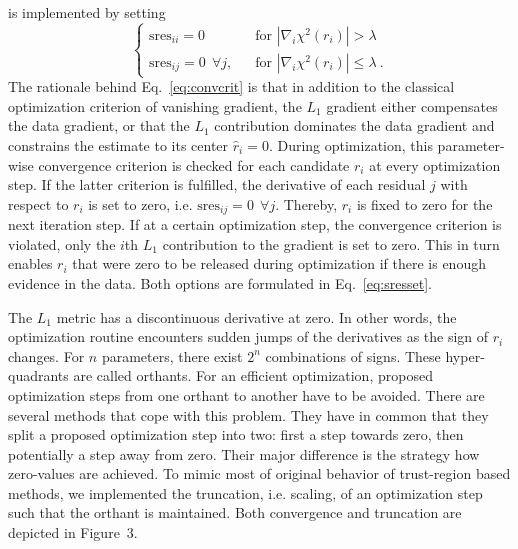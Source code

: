 \documentclass{bioinfo}
\begin{document}
is implemented by setting
\begin{equation}
	\begin{cases}
	\text{sres}_{ii}=0& \text{ for } |\nabla_i \chi^2(r_i)| > \lambda\\
	\text{sres}_{ij}=0\:\:\forall j, \:\:& \text{ for } |\nabla_i \chi^2(r_i)| \le \lambda \:.
	\end{cases}
	\label{eq:sresset}
\end{equation}
The rationale behind Eq.~\ref{eq:convcrit} is that in addition to the classical optimization criterion of vanishing gradient, the $L_1$ gradient either compensates the data gradient, or that the $L_1$ contribution dominates the data gradient and constrains the estimate to its center $\hat r_i=0$.
During optimization, this parameter-wise convergence criterion is checked for each candidate $r_i$ at every optimization step.
If the latter criterion is fulfilled, the derivative of each residual $j$ with respect to $r_i$ is set to zero, i.e. $\text{sres}_{ij}=0\:\:\forall j$.
Thereby, $r_i$ is fixed to zero for the next iteration step.
If at a certain optimization step, the convergence criterion is violated, only the $i$th $L_1$ contribution to the gradient is set to zero.
This in turn enables $r_i$ that were zero to be released during optimization if there is enough evidence in the data.
Both options are formulated in Eq.~\ref{eq:sresset}.

The $L_1$ metric has a discontinuous derivative at zero.
In other words, the optimization routine encounters sudden jumps of the derivatives as the sign of $r_i$ changes.
For $n$ parameters, there exist $2^n$ combinations of signs.
These hyper-quadrants are called orthants.
For an efficient optimization, proposed optimization steps from one orthant to another have to be avoided.
There are several methods that cope with this problem.
They have in common that they split a proposed optimization step into two:
first a step towards zero, then potentially a step away from zero.
Their major difference is the strategy how zero-values are achieved.
To mimic most of original behavior of trust-region based methods, we implemented the truncation, i.e. scaling, of an optimization step such that the orthant is maintained.
Both convergence and truncation are depicted in Figure~3\vphantom{\ref{fig:03}}.
\end{document}
